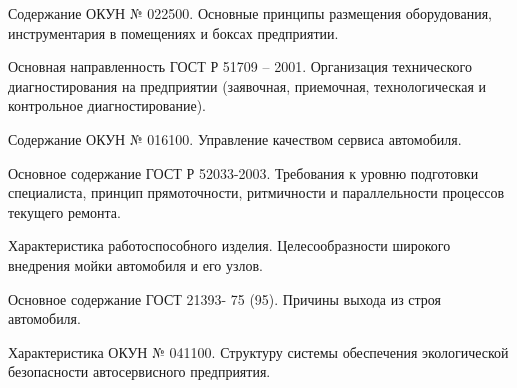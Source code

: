 \documentclass[
	14pt,
	a4paper,
	]
	{scrartcl}
\begin{document}
\shapk
{}
\setcounter{zad}{0}

\vfill
\z Содержание ОКУН № 022500.
 \vfill
\z Основные принципы размещения оборудования, инструментария в помещениях и боксах предприятии. \vfill

\vfill

\newpage


\shapk
{}
\setcounter{zad}{0}

\vfill
\z Основная направленность ГОСТ Р 51709 – 2001.
 \vfill
\z Организация технического диагностирования на предприятии (заявочная, приемочная, технологическая и контрольное диагностирование).
 \vfill

\vfill

\newpage


\shapk
{}
\setcounter{zad}{0}

\vfill
\z Содержание ОКУН № 016100.
 \vfill
\z Управление качеством сервиса автомобиля.
 \vfill

\vfill

\newpage


\shapk
{}
\setcounter{zad}{0}

\vfill
\z Основное содержание ГОСТ Р 52033-2003.
 \vfill
\z Требования к уровню подготовки специалиста, принцип прямоточности, ритмичности и параллельности процессов текущего ремонта.
 \vfill

\vfill

\newpage


\shapk
{}
\setcounter{zad}{0}

\vfill
\z Характеристика работоспособного изделия.
 \vfill
\z Целесообразности широкого внедрения мойки автомобиля и его узлов.
 \vfill

\vfill

\newpage


\shapk
{}
\setcounter{zad}{0}

\vfill
\z Основное содержание ГОСТ 21393- 75 (95).
 \vfill
\z Причины выхода из строя автомобиля.
 \vfill

\vfill

\newpage


\shapk
{}
\setcounter{zad}{0}

\vfill
\z Характеристика ОКУН № 041100.
 \vfill
\z Структуру системы обеспечения экологической безопасности автосервисного предприятия.
 \vfill

\vfill
\end{document}
